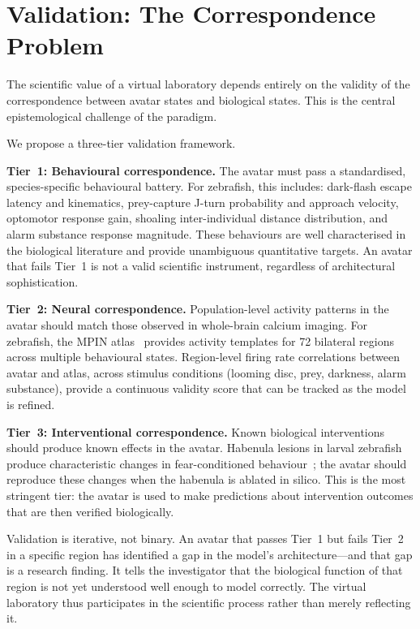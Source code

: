 \documentclass[12pt,a4paper]{article}
\begin{document}
\section*{Validation: The Correspondence Problem}

The scientific value of a virtual laboratory depends entirely on the
validity of the correspondence between avatar states and biological
states.
This is the central epistemological challenge of the paradigm.

We propose a three-tier validation framework.

\textbf{Tier~1: Behavioural correspondence.}
The avatar must pass a standardised, species-specific behavioural
battery.
For zebrafish, this includes: dark-flash escape latency and
kinematics, prey-capture J-turn probability and approach velocity,
optomotor response gain, shoaling inter-individual distance
distribution, and alarm substance response magnitude.
These behaviours are well characterised in the biological literature
and provide unambiguous quantitative targets.
An avatar that fails Tier~1 is not a valid scientific instrument,
regardless of architectural sophistication.

\textbf{Tier~2: Neural correspondence.}
Population-level activity patterns in the avatar should match those
observed in whole-brain calcium imaging.
For zebrafish, the MPIN atlas~\cite{kunst2019} provides activity
templates for 72 bilateral regions across multiple behavioural states.
Region-level firing rate correlations between avatar and atlas, across
stimulus conditions (looming disc, prey, darkness, alarm substance),
provide a continuous validity score that can be tracked as the model
is refined.

\textbf{Tier~3: Interventional correspondence.}
Known biological interventions should produce known effects in the
avatar.
Habenula lesions in larval zebrafish produce characteristic changes in
fear-conditioned behaviour~\cite{agetsuma2010}; the avatar should
reproduce these changes when the habenula is ablated in silico.
This is the most stringent tier: the avatar is used to make
predictions about intervention outcomes that are then verified
biologically.

Validation is iterative, not binary.
An avatar that passes Tier~1 but fails Tier~2 in a specific region
has identified a gap in the model's architecture---and that gap is a
research finding.
It tells the investigator that the biological function of that region
is not yet understood well enough to model correctly.
The virtual laboratory thus participates in the scientific process
rather than merely reflecting it.
\end{document}
